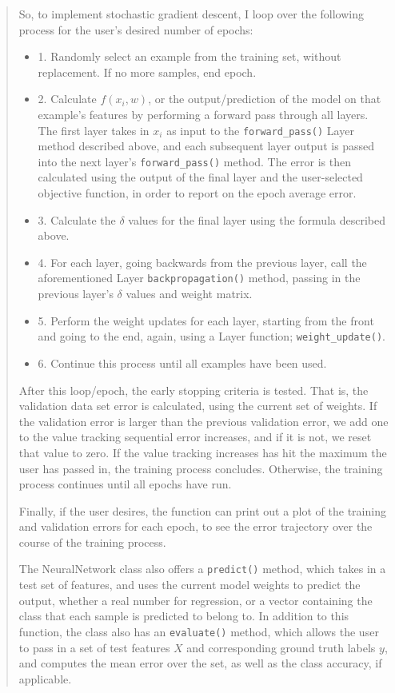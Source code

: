 \documentclass{article}
\begin{document}
\begin{quote}
So, to implement stochastic gradient descent, I loop over the following process for the user's desired number of epochs:

\begin{itemize}
	\item [] 1. Randomly select an example from the training set, without replacement. If no more samples, end epoch.
	\item [] 2. Calculate $f(x_i, w)$, or the output/prediction of the model on that example's features by performing a forward pass through all layers. The first layer takes in $x_i$ as input to the \texttt{forward\_pass()} Layer method described above, and each subsequent layer output is passed into the next layer's \texttt{forward\_pass()} method. The error is then calculated using the output of the final layer and the user-selected objective function, in order to report on the epoch average error.
	\item [] 3. Calculate the $\delta$ values for the final layer using the formula described above.
	\item [] 4. For each layer, going backwards from the previous layer, call the aforementioned Layer \texttt{backpropagation()} method, passing in the previous layer's $\delta$ values and weight matrix.
	\item [] 5. Perform the weight updates for each layer, starting from the front and going to the end, again, using a Layer function; \texttt{weight\_update()}.
	\item [] 6. Continue this process until all examples have been used.
\end{itemize}

After this loop/epoch, the early stopping criteria is tested. That is, the validation data set error is calculated, using the current set of weights. If the validation error is larger than the previous validation error, we add one to the value tracking sequential error increases, and if it is not, we reset that value to zero. If the value tracking increases has hit the maximum the user has passed in, the training process concludes. Otherwise, the training process continues until all epochs have run. 

Finally, if the user desires, the function can print out a plot of the training and validation errors for each epoch, to see the error trajectory over the course of the training process.

The NeuralNetwork class also offers a \texttt{predict()} method, which takes in a test set of features, and uses the current model weights to predict the output, whether a real number for regression, or a vector containing the class that each sample is predicted to belong to. In addition to this function, the class also has an \texttt{evaluate()} method, which allows the user to pass in a set of test features $X$ and corresponding ground truth labels $y$, and computes the mean error over the set, as well as the class accuracy, if applicable.


\end{quote}
\end{document}
